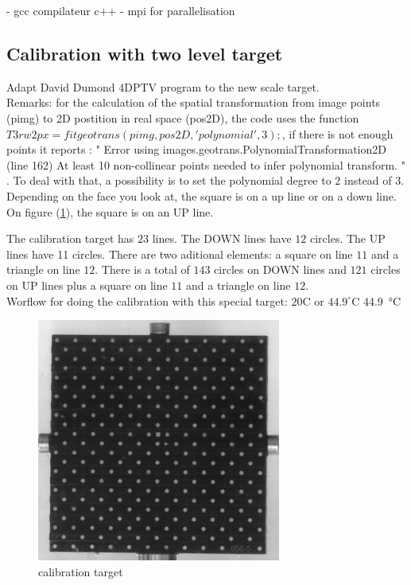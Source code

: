\documentclass[twocolumn,amsmath,amssymb,floatfix]{article}
\begin{document}
- gcc compilateur c++
- mpi for parallelisation

\subsection{Calibration with two level target}

Adapt David Dumond 4DPTV program to the new scale target.\\

Remarks: for the calculation of the spatial transformation from image points (pimg) to 2D postition in real space (pos2D), the code uses the function $T3rw2px  = fitgeotrans(pimg,pos2D,'polynomial',3);$, if there is not enough points it reports : " Error using images.geotrans.PolynomialTransformation2D (line 162)
At least 10 non-collinear points needed to infer polynomial transform. " . To deal with that, a possibility is to set the polynomial degree to $2$ instead of $3$.\\

Depending on the face you look at, the square is on a up line or on a down line. On figure (\ref{fig:caltarget}), the square is on an UP line.

The calibration target has $23$ lines. The DOWN lines have $12$ circles. The UP lines have 11 circles. There are two aditional elements: a square on line $11$ and a triangle on line $12$. There is a total of $143$ circles on DOWN lines and $121$ circles on UP lines plus a square on line $11$ and a triangle on line $12$. \\

Worflow for doing the calibration with this special target: $20$\textdegree{}C or $44.9^\circ$C \SI{44.9}{\celsius}

\begin{figure}
\includegraphics[height=8cm]{figures/calibrationTarget.png}
\caption{calibration target}
\label{fig:caltarget}
\end{figure}
\end{document}
